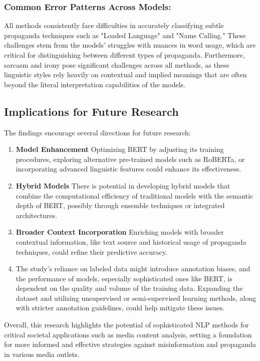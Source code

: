 \documentclass[twocolumn]{article}
\begin{document}
\subsubsection*{Common Error Patterns Across Models:}
All methods consistently face difficulties in accurately classifying subtle propaganda techniques such as "Loaded Language" and "Name Calling." These challenges stem from the models' struggles with nuances in word usage, which are critical for distinguishing between different types of propaganda. Furthermore, sarcasm and irony pose significant challenges across all methods, as these linguistic styles rely heavily on contextual and implied meanings that are often beyond the literal interpretation capabilities of the models.

\subsection*{Implications for Future Research}
The findings encourage several directions for future research:
\begin{enumerate}
  \item \textbf{Model Enhancement} Optimizing BERT by adjusting its training procedures, exploring alternative pre-trained models such as RoBERTa, or incorporating advanced linguistic features could enhance its effectiveness.
  \item \textbf{Hybrid Models} There is potential in developing hybrid models that combine the computational efficiency of traditional models with the semantic depth of BERT, possibly through ensemble techniques or integrated architectures.
  \item \textbf{Broader Context Incorporation} Enriching models with broader contextual information, like text source and historical usage of propaganda techniques, could refine their predictive accuracy.
  \item The study's reliance on labeled data might introduce annotation biases, and the performance of models, especially sophisticated ones like BERT, is dependent on the quality and volume of the training data. Expanding the dataset and utilizing unsupervised or semi-supervised learning methods, along with stricter annotation guidelines, could help mitigate these issues.
\end{enumerate}

Overall, this research highlights the potential of sophisticated NLP methods for critical societal applications such as media content analysis, setting a foundation for more informed and effective strategies against misinformation and propaganda in various media outlets.
\end{document}
